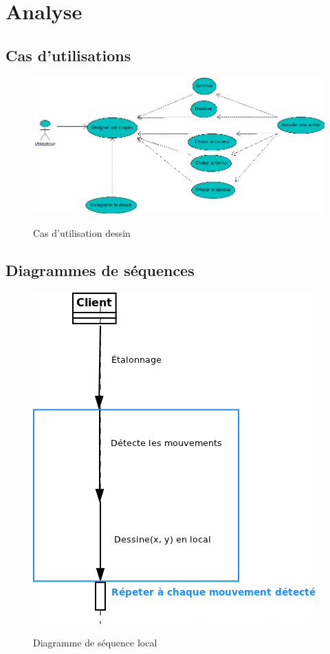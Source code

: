 \documentclass{report}
\begin{document}
		\newpage
		\section{Analyse}
			\subsection{Cas d'utilisations}
				\begin{figure}[!h]
						\centering
						\includegraphics[scale=0.6]{../uml/Dessin.png}\\
						\caption{Cas d'utilisation dessin}
						\label{Cas d'utilisation}
				\end{figure}
			\newpage
			\subsection{Diagrammes de séquences}
				\begin{figure}[!h]
						\centering
						\includegraphics[scale=0.6]{../soutenance/sequence_local.png}\\
						\caption{Diagramme de séquence local}
						\label{Diagramme de séquence local}
				\end{figure}
\end{document}
